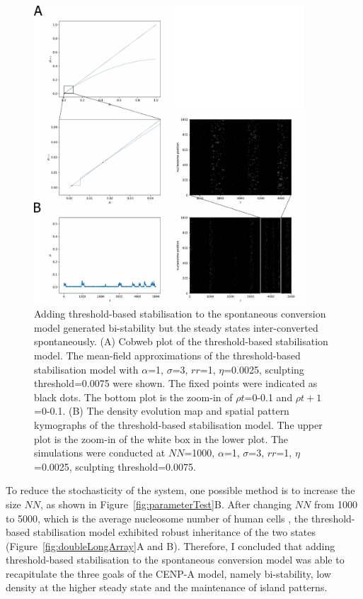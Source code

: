 \begin{figure}[htbp]
  \centering
  \includegraphics[width=0.9\textwidth]{chapter2/figures/doubleCobweb.pdf}
  \caption[Adding threshold-based stabilisation to the spontaneous conversion model generated bi-stability but the steady states inter-converted spontaneously]{Adding threshold-based stabilisation to the spontaneous conversion model generated bi-stability but the steady states inter-converted spontaneously. (A) Cobweb plot of the threshold-based stabilisation model. The mean-field approximations of the threshold-based stabilisation model with $\alpha$=1, $\sigma$=3, $rr$=1, $\eta$=0.0025, sculpting threshold=0.0075 were shown. The fixed points were indicated as black dots. The bottom plot is the zoom-in of $\rho{t}$=0-0.1 and $\rho{t+1}$=0-0.1. (B) The density evolution map and spatial pattern kymographs of the threshold-based stabilisation model. The upper plot is the zoom-in of the white box in the lower plot. The simulations were conducted at $NN$=1000, $\alpha$=1, $\sigma$=3, $rr$=1, $\eta$=0.0025, sculpting threshold=0.0075. }
  \label{fig:doubleCobweb}
\end{figure}

To reduce the stochasticity of the system, one possible method is to increase the size $NN$, as shown in Figure~\ref{fig:parameterTest}B. After changing $NN$ from 1000 to 5000, which is the average nucleosome number of human cells \citep{Bodor2014}, the threshold-based stabilisation model exhibited robust inheritance of the two states (Figure~\ref{fig:doubleLongArray}A and B). Therefore, I concluded that adding threshold-based stabilisation to the spontaneous conversion model was able to recapitulate the three goals of the CENP-A model, namely bi-stability, low density at the higher steady state and the maintenance of island patterns.



